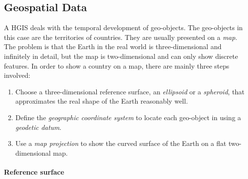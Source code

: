 
\subsection{Geospatial Data} %
\label{sub:geospatial_data}

A HGIS deals with the temporal development of geo-objects. The geo-objects in this case are the territories of countries. They are usually presented on a \emph{map}. The problem is that the Earth in the real world is three-dimensional and infinitely in detail, but the map is two-dimensional and can only show discrete features. In order to show a country on a map, there are mainly three steps involved:

\begin{enumerate}
  \item Choose a three-dimensional reference surface, an \emph{ellipsoid} or a \emph{spheroid}, that approximates the real shape of the Earth reasonably well.
  \item Define the \emph{geographic coordinate system} to locate each geo-object in using a \emph{geodetic datum}.
  \item Use a \emph{map projection} to show the curved surface of the Earth on a flat two-dimensional map.
\end{enumerate}

\paragraph{Reference surface} %
\label{par:reference_surface}

